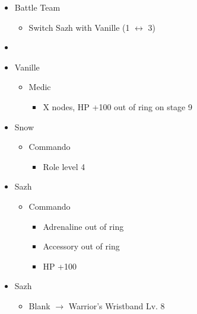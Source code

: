 \begin{menu}
\begin{itemize}
    \paradigm
    \begin{itemize}
        \item Battle Team
        \begin{itemize}
            \item Switch Sazh with Vanille (1 $\leftrightarrow$ 3)
        \end{itemize}
        \item {}%
{\paradigmline{(\med)}{\com}{(\com)}}%
{\paradigmline{(\sab)}{\com}{\com}}%
{\paradigmline{(\sab)}{\sen}{(\syn)}}%
{\paradigmline{(\rav)}{(\rav)}{(\syn)}}%
{\paradigmline[5]{\textit{(\sab)}}{\textit{(\rav)}}{\textit{\rav}}}%
{\paradigmline{\rav}{\rav}{\rav}}
    \end{itemize}
    \crystarium
    \begin{itemize}
        \item Vanille
        \begin{itemize}
            \item Medic
            \begin{itemize}
            	\item X nodes, HP +100 out of ring on stage 9
            \end{itemize}
        \end{itemize}
        \item Snow
        \begin{itemize}
            \item Commando
            \begin{itemize}
                \item Role level 4
            \end{itemize}
        \end{itemize}
        \item Sazh
        \begin{itemize}
            \item Commando
            \begin{itemize}
                \item Adrenaline out of ring
                \item Accessory out of ring
                \item HP +100
            \end{itemize}
        \end{itemize}
    \end{itemize}
    \equip
    \begin{itemize}
        \item Sazh
        \begin{itemize}
            \item Blank $\rightarrow$ Warrior's Wristband Lv. 8
        \end{itemize}
    \end{itemize}
\end{itemize}
\end{menu}

